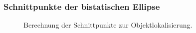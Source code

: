 \begin{frame}
    \frametitle{Schnittpunkte der bistatischen Ellipse}

    \begin{figure}
        \centering
        \begin{adjustbox}{max width=\linewidth,totalheight=\baselineskip}
            \begin{tikzpicture}
                
            \end{tikzpicture}
        \end{adjustbox}
        \caption{Berechnung der Schnittpunkte zur Objektlokalisierung.}
    \end{figure}
\end{frame}
